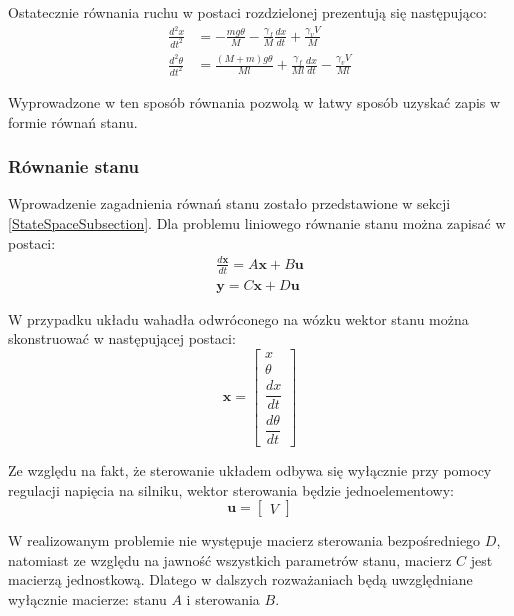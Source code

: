 \documentclass[12pt, oneside]{report}
\theoremstyle{definition}
\begin{document}
Ostatecznie równania ruchu w postaci rozdzielonej prezentują się następująco:
\begin{equation} \label{SimpleEquation}
\begin{aligned}
\frac{d^2x}{dt^2} &= -\frac{mg \theta}{M} - \frac{\gamma_f}{M} \frac{dx}{dt} + \frac{\gamma_v V}{M}\\
\frac{d^2\theta}{dt^2} &= \frac{(M+m)g\theta}{Ml} + \frac{\gamma_f}{Ml}\frac{dx}{dt} - \frac{\gamma_vV}{Ml}
\end{aligned}
\end{equation}

Wyprowadzone w ten sposób równania pozwolą w łatwy sposób uzyskać zapis w formie równań stanu.

\subsubsection{Równanie stanu}
Wprowadzenie zagadnienia równań stanu zostało przedstawione w sekcji \ref{StateSpaceSubsection}. Dla problemu liniowego równanie stanu można zapisać w postaci:
\begin{equation}
\begin{aligned}
\frac{d\mathbf{x}}{dt} = A\mathbf{x} + B\mathbf{u} \\
\mathbf{y} = C\mathbf{x} + D\mathbf{u}
\end{aligned}
\end{equation}

W przypadku układu wahadła odwróconego na wózku wektor stanu można skonstruować w następującej postaci:
\begin{equation}
\mathbf{x} = 
\begin{bmatrix}
x \\ 
\theta \\ 
\dfrac{dx}{dt} \\[8pt] 
\dfrac{d\theta}{dt}
\end{bmatrix}
\end{equation}

Ze względu na fakt, że sterowanie układem odbywa się wyłącznie przy pomocy regulacji napięcia na silniku, wektor sterowania będzie jednoelementowy:
\begin{equation}
\mathbf{u} = 
\begin{bmatrix}
V
\end{bmatrix}
\end{equation}

W realizowanym problemie nie występuje macierz sterowania bezpośredniego $D$, natomiast ze względu na jawność wszystkich parametrów stanu, macierz $C$ jest macierzą jednostkową. Dlatego w dalszych rozważaniach będą uwzględniane wyłącznie macierze: stanu $A$ i sterowania $B$.
\end{document}
